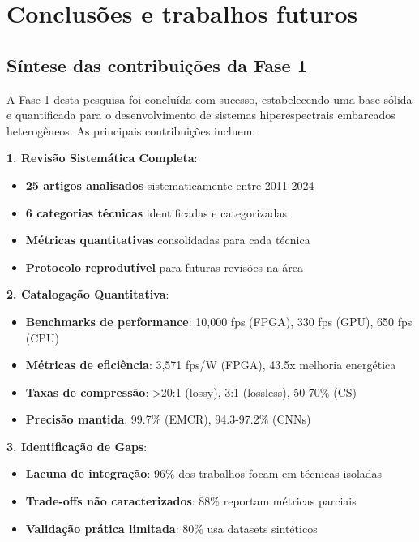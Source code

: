 \chapter{Conclusões e trabalhos futuros}\label{chp:conclusoes}

\section{Síntese das contribuições da Fase 1}\label{sec:sintese_contribuicoes}

A Fase 1 desta pesquisa foi concluída com sucesso, estabelecendo uma base sólida e quantificada para o desenvolvimento de sistemas hiperespectrais embarcados heterogêneos. As principais contribuições incluem:

\textbf{1. Revisão Sistemática Completa}:
\begin{itemize}
    \item \textbf{25 artigos analisados} sistematicamente entre 2011-2024
    \item \textbf{6 categorias técnicas} identificadas e categorizadas
    \item \textbf{Métricas quantitativas} consolidadas para cada técnica
    \item \textbf{Protocolo reprodutível} para futuras revisões na área
\end{itemize}

\textbf{2. Catalogação Quantitativa}:
\begin{itemize}
    \item \textbf{Benchmarks de performance}: 10,000 fps (FPGA), 330 fps (GPU), 650 fps (CPU)
    \item \textbf{Métricas de eficiência}: 3,571 fps/W (FPGA), 43.5x melhoria energética
    \item \textbf{Taxas de compressão}: >20:1 (lossy), 3:1 (lossless), 50-70\% (CS)
    \item \textbf{Precisão mantida}: 99.7\% (EMCR), 94.3-97.2\% (CNNs)
\end{itemize}

\textbf{3. Identificação de Gaps}:
\begin{itemize}
    \item \textbf{Lacuna de integração}: 96\% dos trabalhos focam em técnicas isoladas
    \item \textbf{Trade-offs não caracterizados}: 88\% reportam métricas parciais
    \item \textbf{Validação prática limitada}: 80\% usa datasets sintéticos
\end{itemize}

